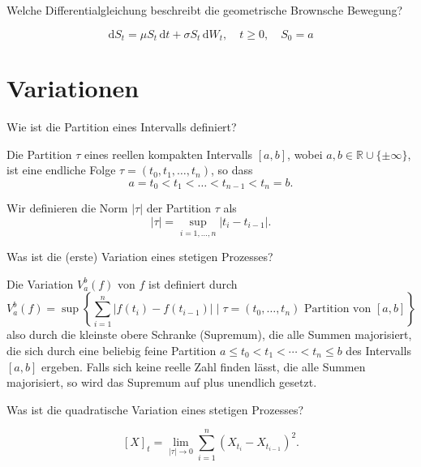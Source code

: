\begin{QandA}
    \item Welche Differentialgleichung beschreibt die geometrische Brownsche Bewegung?
    \begin{answered}
        \[
            \mathrm {d} S_{t}=\mu S_{t}\,\mathrm {d} t+\sigma S_{t}\,\mathrm {d} W_{t},\quad t\geq 0,\quad S_{0}=a
        \]
    \end{answered}
\end{QandA}

\newpage
\section*{Variationen}

\begin{QandA}
    \item Wie ist die Partition eines Intervalls definiert?
    \begin{answered}
        Die Partition $\tau$ eines reellen kompakten Intervalls $[a, b]$, wobei $a,b\in \mathbb{R} \cup \{\pm \infty \}$, ist eine endliche Folge $\tau=(t_{0},t_{1},\dots ,t_{n})$, so dass
        \[
            a = t_0 < t_1 < \dots < t_{n-1} < t_n = b.
        \]

        Wir definieren die Norm $|\tau|$ der Partition $\tau$ als
        \[
            |\tau| = \sup_{i=1,\dots,n} |t_i - t_{i-1}|.
        \]
    \end{answered}

    \item Was ist die (erste) Variation eines stetigen Prozesses?
    \begin{answered}
        Die Variation $V_a^b(f)$ von $f$ ist definiert durch
        \[
            V_a^b(f) = \sup \left\{ \sum_{i=1}^{n} |f(t_{i})-f(t_{i-1})| \mid \tau = (t_{0},\dots ,t_{n}) \text{ Partition von } [a,b] \right\}
        \]
        also durch die kleinste obere Schranke (Supremum), die alle Summen majorisiert, die sich durch eine beliebig feine Partition $a \leq t_{0} < t_{1} < \dotsb < t_{n} \leq b$ des Intervalls $[a,b]$ ergeben.
        Falls sich keine reelle Zahl finden lässt, die alle Summen majorisiert, so wird das Supremum auf plus unendlich gesetzt.
    \end{answered}

    \item Was ist die quadratische Variation eines stetigen Prozesses?
    \begin{answered}
        \[
            [X]_{t} = \lim_{|\tau |\to 0} \sum_{i=1}^{n} (X_{t_{i}}-X_{t_{i-1}})^{2}.
        \]


\end{answered}
\end{QandA}
